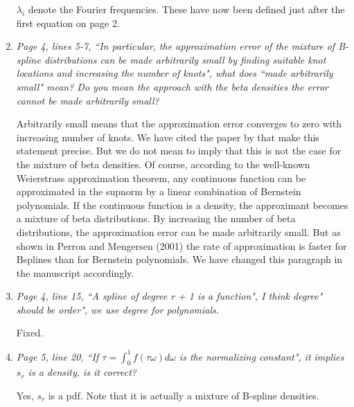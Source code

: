 \documentclass{scrartcl}
\newcommand{\refereeQuote}{\textit }
\newcommand{\response}{}
\begin{document}
\begin{enumerate}
	\response{$\lambda_i$ denote the Fourier frequencies. These have now been defined just after the first equation on page 2.} \bigskip
	
	\item \refereeQuote{ Page 4, lines 5-7, ``In particular, the approximation error of the mixture of B-spline distributions can be made arbitrarily small by finding suitable knot locations and increasing the number of knots", what does ``made arbitrarily small" mean? Do you mean the approach with the beta densities the error cannot be made arbitrarily small?}\smallskip
	
	\response{Arbitrarily small means that the approximation error converges to zero with increasing number of knots. We have  cited the paper by \cite{Perron:2001} that make this statement precise. But we do not mean to imply that this is not the case for the mixture of beta densities. Of course, according to the well-known Weierstrass approximation theorem, any continuous function can be approximated in the supnorm by a linear combination of Bernstein polynomials. If the continuous function is a density, the approximant becomes a mixture of beta distributions. By increasing the number of beta distributions, the approximation error can be made arbitrarily small. But as shown in Perron and Mengersen (2001) the rate of approximation is faster for Bsplines than for Bernstein polynomials. We have changed this paragraph in the manuscript accordingly.}

	
	\item \refereeQuote{Page 4, line 15, ``A spline of degree r + 1 is a function", I think degree" should be order", we use degree for polynomials.}\smallskip
	
	\response{Fixed.} \bigskip	
	
	\item \refereeQuote{Page 5, line 20, ``If $\tau = \int_0^1f(\tau \omega)d \omega$ is the normalizing constant", it implies $s_r$ is a density, is it correct?}
	
	\response{Yes, $s_r$ is a pdf.  Note that it is actually a mixture of B-spline densities.}
\end{enumerate}
\end{document}
